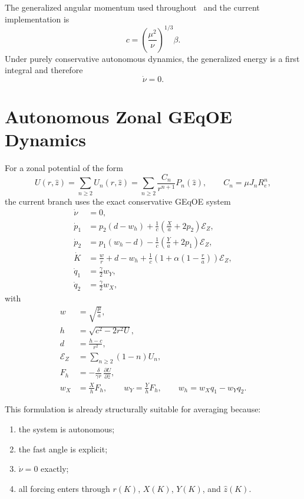 \documentclass[11pt]{article}
\begin{document}
The generalized angular momentum used throughout~\cite{bau2021} and the
current implementation is
\begin{equation}
c = \left(\frac{\mu^2}{\nu}\right)^{1/3}\beta. \label{eq:cdef}
\end{equation}
Under purely conservative autonomous dynamics, the generalized energy is a first
integral and therefore
\begin{equation}
\dot{\nu} = 0.
\end{equation}

\section{Autonomous Zonal GEqOE Dynamics}

For a zonal potential of the form
\begin{equation}
U(r,\hat z) = \sum_{n\ge 2} U_n(r,\hat z)
= \sum_{n\ge 2} \frac{C_n}{r^{n+1}} P_n(\hat z),
\qquad
C_n = \mu J_n R_e^n,
\end{equation}
the current branch uses the exact conservative GEqOE system
\begin{align}
\dot{\nu} &= 0, \\
\dot{p}_1 &= p_2(d-w_h)
+ \frac{1}{c}\left(\frac{X}{a}+2p_2\right)\mathcal{E}_Z, \label{eq:p1_zonal}\\
\dot{p}_2 &= p_1(w_h-d)
- \frac{1}{c}\left(\frac{Y}{a}+2p_1\right)\mathcal{E}_Z, \label{eq:p2_zonal}\\
\dot{K} &= \frac{w}{r} + d - w_h
+ \frac{1}{c}\left(1+\alpha\left(1-\frac{r}{a}\right)\right)\mathcal{E}_Z, \\
\dot{q}_1 &= \frac{\gamma}{2} w_Y, \label{eq:q1_zonal}\\
\dot{q}_2 &= \frac{\gamma}{2} w_X, \label{eq:q2_zonal}
\end{align}
with
\begin{align}
w &= \sqrt{\frac{\mu}{a}}, \\
h &= \sqrt{c^2 - 2r^2 U}, \\
d &= \frac{h-c}{r^2}, \\
\mathcal{E}_Z &= \sum_{n\ge 2} (1-n) U_n, \\
F_h &= - \frac{\delta}{\gamma r}\,\frac{\partial U}{\partial \hat z}, \\
w_X &= \frac{X}{h}F_h, \qquad
w_Y = \frac{Y}{h}F_h, \qquad
w_h = w_X q_1 - w_Y q_2.
\end{align}

This formulation is already structurally suitable for averaging because:
\begin{enumerate}
    \item the system is autonomous;
    \item the fast angle is explicit;
    \item $\dot{\nu}=0$ exactly;
    \item all forcing enters through $r(K)$, $X(K)$, $Y(K)$, and $\hat z(K)$.
\end{enumerate}
\end{document}

